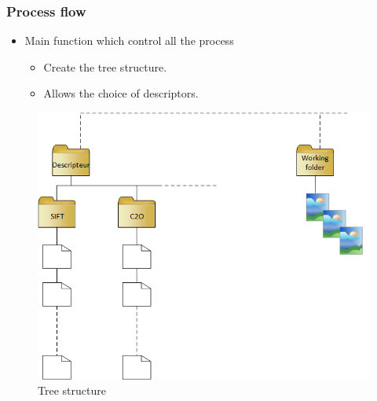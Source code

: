 \documentclass[xcolor=table]{beamer}
\begin{document}
\begin{frame} \frametitle{Process flow}

\begin{itemize}
    \item Main function which control all the process
    \begin{itemize}
        \item Create the tree structure.
        \item Allows the choice of descriptors.
    \end{itemize}
\end{itemize}

\begin{figure}[ht]
        \centering
        \includegraphics[scale=0.25]{arborescence.png}
        \caption{Tree structure}
        \label{fig:img_arbo}
    \end{figure}


\end{frame}
\end{document}
